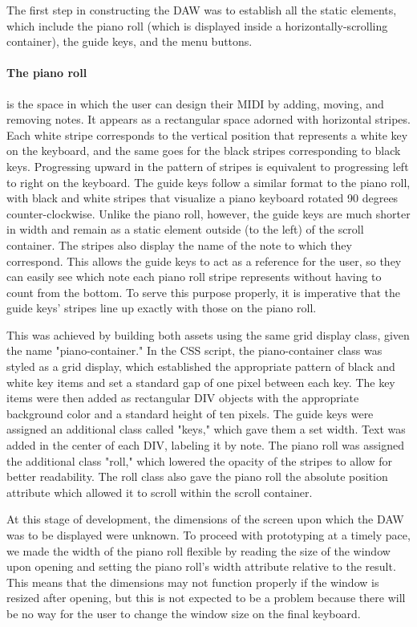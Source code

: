 The first step in constructing the DAW was to establish all the static elements, which include
the piano roll (which is displayed inside a horizontally-scrolling container), the guide keys, and
the menu buttons.

\paragraph{The piano roll} is the space in which the user can design their MIDI by adding,
moving, and removing notes. It appears as a rectangular space adorned with horizontal stripes. Each
white stripe corresponds to the vertical position that represents a white key on the keyboard, and
the same goes for the black stripes corresponding to black keys. Progressing upward in the pattern
of stripes is equivalent to progressing left to right on the keyboard. The guide keys follow a
similar format to the piano roll, with black and white stripes that visualize a piano keyboard
rotated 90 degrees counter-clockwise. Unlike the piano roll, however, the guide keys are much
shorter in width and remain as a static element outside (to the left) of the scroll container.
The stripes also display the name of the note to which they correspond. This allows the guide keys
to act as a reference for the user, so they can easily see which note each piano roll stripe
represents without having to count from the bottom. To serve this purpose properly, it is
imperative that the guide keys' stripes line up exactly with those on the piano roll.

This was achieved by building both assets using the same grid display class, given the name
"piano-container." In the CSS script, the piano-container class was styled as a grid display,
which established the appropriate pattern of black and white key items and set a standard gap of
one pixel between each key. The key items were then added as rectangular DIV objects with the
appropriate background color and a standard height of ten pixels. The guide keys were assigned an
additional class called "keys," which gave them a set width. Text was added in the center of each
DIV, labeling it by note. The piano roll was assigned the additional class "roll," which lowered
the opacity of the stripes to allow for better readability. The roll class also gave the piano roll
the absolute position attribute which allowed it to scroll within the scroll container.

At this stage of development, the dimensions of the screen upon which the DAW was to be displayed
were unknown. To proceed with prototyping at a timely pace, we made the width of the piano roll
flexible by reading the size of the window upon opening and setting the piano roll's width
attribute relative to the result. This means that the dimensions may not function properly if the
window is resized after opening, but this is not expected to be a problem because there will be
no way for the user to change the window size on the final keyboard.

